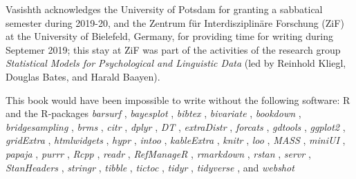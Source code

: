 \documentclass[12pt,]{krantz}
\theoremstyle{definition}
\theoremstyle{definition}
\theoremstyle{definition}
\theoremstyle{remark}
\begin{document}
Vasishth acknowledges the University of Potsdam for granting a sabbatical semester during 2019-20, and the Zentrum für Interdisziplinäre Forschung (ZiF) at the University of Bielefeld, Germany, for providing time for writing during Septemer 2019; this stay at ZiF was part of the activities of the research group \emph{Statistical Models for Psychological and Linguistic Data} (led by Reinhold Kliegl, Douglas Bates, and Harald Baayen).

This book would have been impossible to write without the following software: R \citep[Version 3.6.3;][]{R-base} and the R-packages \emph{barsurf} \citep[Version 0.5.0;][]{R-barsurf}, \emph{bayesplot} \citep[Version 1.7.2;][]{R-bayesplot}, \emph{bibtex} \citep[Version 0.4.2.2;][]{R-bibtex}, \emph{bivariate} \citep[Version 0.5.0;][]{R-bivariate}, \emph{bookdown} \citep[Version 0.20.2;][]{R-bookdown}, \emph{bridgesampling} \citep[Version 1.0.0;][]{R-bridgesampling}, \emph{brms} \citep[Version 2.13.5;][]{R-brms}, \emph{citr} \citep[Version 0.3.2;][]{R-citr}, \emph{dplyr} \citep[Version 1.0.1;][]{R-dplyr}, \emph{DT} \citep[Version 0.15;][]{R-DT}, \emph{extraDistr} \citep[Version 1.8.11;][]{R-extraDistr}, \emph{forcats} \citep[Version 0.4.0;][]{R-forcats}, \emph{gdtools} \citep[Version 0.2.2;][]{R-gdtools}, \emph{ggplot2} \citep[Version 3.3.2;][]{R-ggplot2}, \emph{gridExtra} \citep[Version 2.3;][]{R-gridExtra}, \emph{htmlwidgets} \citep[Version 1.5.1;][]{R-htmlwidgets}, \emph{hypr} \citep[Version 0.1.9;][]{R-hypr_a, R-hypr_b}, \emph{intoo} \citep[Version 0.4.0;][]{R-intoo}, \emph{kableExtra} \citep[Version 1.1.0;][]{R-kableExtra}, \emph{knitr} \citep[Version 1.29;][]{R-knitr}, \emph{loo} \citep[Version 2.3.1;][]{R-loo_a, R-loo_b}, \emph{MASS} \citep[Version 7.3.51.5;][]{R-MASS}, \emph{miniUI} \citep[Version 0.1.1.1;][]{R-miniUI}, \emph{papaja} \citep[Version 0.1.0.9942;][]{R-papaja}, \emph{purrr} \citep[Version 0.3.4;][]{R-purrr}, \emph{Rcpp} \citep[Version 1.0.5;][]{R-Rcpp}, \emph{readr} \citep[Version 1.3.1;][]{R-readr}, \emph{RefManageR} \citep[Version 1.2.12;][]{R-RefManageR}, \emph{rmarkdown} \citep[Version 2.3.3;][]{R-rmarkdown}, \emph{rstan} \citep[Version 2.21.2;][]{R-rstan}, \emph{servr} \citep[Version 0.15;][]{R-servr}, \emph{StanHeaders} \citep[Version 2.21.0.6;][]{R-StanHeaders}, \emph{stringr} \citep[Version 1.4.0;][]{R-stringr}, \emph{tibble} \citep[Version 3.0.3;][]{R-tibble}, \emph{tictoc} \citep[Version 1.0;][]{R-tictoc}, \emph{tidyr} \citep[Version 1.1.0;][]{R-tidyr}, \emph{tidyverse} \citep[Version 1.3.0;][]{R-tidyverse}, and \emph{webshot} \citep[Version 0.5.2;][]{R-webshot}
\end{document}
